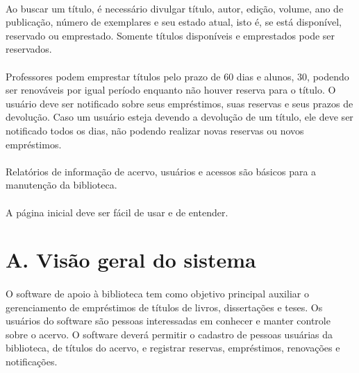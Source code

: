 \documentclass[a4paper]{article}
\begin{document}
	\paragraph{}
	Ao buscar um título, é necessário divulgar título, autor, edição, volume, ano de publicação, número de exemplares e seu estado atual, isto é, se está disponível, reservado ou emprestado. Somente títulos disponíveis e emprestados pode ser reservados.
	\paragraph{}
	Professores podem emprestar títulos pelo prazo de 60 dias e alunos, 30, podendo ser renováveis por igual período enquanto não houver reserva para o título. O usuário deve ser notificado sobre seus empréstimos, suas reservas e seus prazos de devolução. Caso um usuário esteja devendo a devolução de um título, ele deve ser notificado todos os dias, não podendo realizar novas reservas ou novos empréstimos.
	\paragraph{}
	Relatórios de informação de acervo, usuários e acessos são básicos para a manutenção da biblioteca.
	\paragraph{}
	A página inicial deve ser fácil de usar e de entender.
	\section*{A. Visão geral do sistema}
	\paragraph{}
	O software de apoio à biblioteca tem como objetivo principal auxiliar o gerenciamento de empréstimos de títulos de livros, dissertações e teses. Os usuários do software são pessoas interessadas em conhecer e manter controle sobre o acervo. O software deverá permitir o cadastro de pessoas usuárias da biblioteca, de títulos do acervo, e registrar reservas, empréstimos, renovações e notificações.
	
\end{document}
